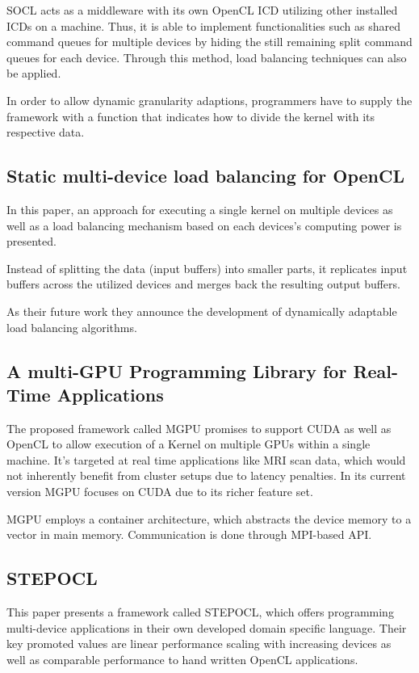 SOCL acts as a middleware with its own OpenCL ICD utilizing other installed ICDs on a machine. Thus, it is able to implement functionalities such as shared command queues for multiple devices by hiding the still remaining split command queues for each device. Through this method, load balancing techniques can also be applied.

In order to allow dynamic granularity adaptions, programmers have to supply the framework with a function that indicates how to divide the kernel with its respective data.

\subsection*{Static multi-device load balancing for OpenCL\cite{delalama_2012}}
In this paper, an approach for executing a single kernel on multiple devices as well as a load balancing mechanism based on each devices's computing power is presented.

Instead of splitting the data (input buffers) into smaller parts, it replicates input buffers across the utilized devices and merges back the resulting output buffers.

As their future work they announce the development of dynamically adaptable load balancing algorithms.


\subsection*{A multi-GPU Programming Library for Real-Time Applications\cite{mgpu}}
The proposed framework called MGPU promises to support CUDA as well as OpenCL to allow execution of a Kernel on multiple GPUs within a single machine. It's targeted at real time applications like MRI scan data, which would not inherently benefit from cluster setups due to latency penalties.  In its current version MGPU focuses on CUDA due to its richer feature set.

MGPU employs a container architecture, which abstracts the device memory to a vector in main memory. Communication is done through MPI-based API.


\subsection*{STEPOCL\cite{stepocl}}

This paper presents a framework called STEPOCL, which offers programming multi-device applications in their own developed domain specific language. Their key promoted values are linear performance scaling with increasing devices as well as comparable performance to hand written OpenCL applications.

